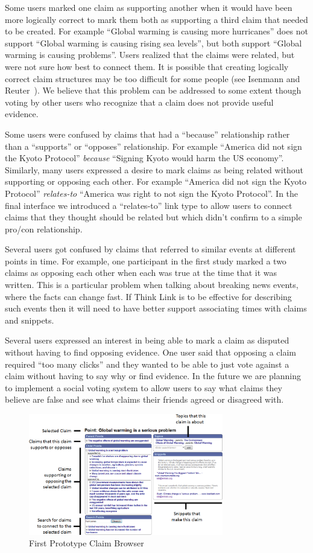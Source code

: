 \documentclass{chi2009}
\begin{document}
Some users marked one claim as supporting another when it would have been more logically correct to mark them both as supporting a third claim that needed to be created. For example ``Global warming is causing more hurricanes'' does not support ``Global warming is causing rising sea levels'', but both support ``Global warming is causing problems''. Users realized that the claims were related, but were not sure how best to connect them. It is possible that creating logically correct claim structures may be too difficult for some people (see Isenmann and Reuter~\cite{Isenmann1997}). We believe that this problem can be addressed to some extent though voting by other users who recognize that a claim does not provide useful evidence. 

Some users were confused by claims that had a ``because'' relationship rather than a ``supports'' or ``opposes'' relationship. For example ``America did not sign the Kyoto Protocol'' {\it because} ``Signing Kyoto would harm the US economy''. Similarly, many users expressed a desire to mark claims as being related without supporting or opposing each other. For example ``America did not sign the Kyoto Protocol'' {\it  relates-to} ``America was right to not sign the Kyoto Protocol''. In the final interface we introduced a ``relates-to'' link type to allow users to connect claims that they thought should be related but which didn't confirm to a simple pro/con relationship. 

Several users got confused by claims that referred to similar events at different points in time. 
For example, one participant in the first study marked a two claims as opposing each other when each was true at the time that it was written. This is a particular problem when talking about breaking news events, where the facts can change fast. If Think Link is to be effective for describing such events then it will need to have better support associating times with claims and snippets.

Several users expressed an interest in being able to mark a claim as disputed without having to find opposing evidence. One user said that opposing a claim required ``too many clicks'' and they wanted to be able to just vote against a claim without having to say why or find evidence. In the future we are planning to implement a social voting system to allow users to say what claims they believe are false and see what claims their friends agreed or disagreed with.

\begin{figure}[tb]
	\includegraphics[width=8.5cm]{../screenshots/oldpoint_diagram.png}
	\caption{First Prototype Claim Browser}
	\label{oldbrowser}
\end{figure}
\end{document}

